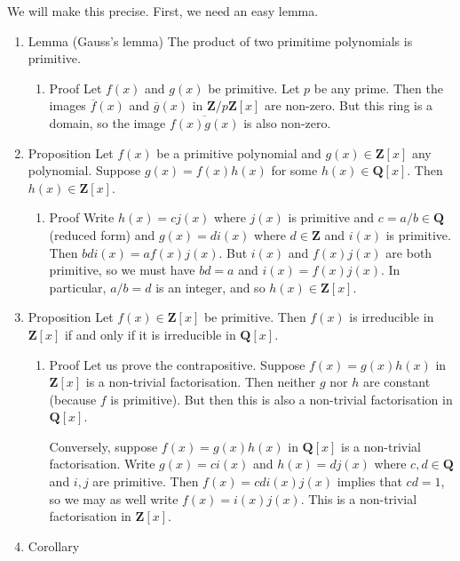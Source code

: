 \documentclass[11pt]{article}
\begin{document}
We will make this precise.
First, we need an easy lemma.
\begin{enumerate}
\item Lemma (Gauss's lemma)
\label{sec:orgea13c4b}
The product of two primitime polynomials is primitive.
\begin{enumerate}
\item Proof
\label{sec:org8aa2631}
Let \(f(x)\) and \(g(x)\) be primitive.
Let \(p\) be any prime.
Then the images \(\overline f(x)\) and \(\overline g(x)\) in \(\mathbf{Z}/p \mathbf{Z} [x]\) are non-zero.
But this ring is a domain, so the image \(\overline {f(x)g(x)}\) is also non-zero.
\end{enumerate}
\item Proposition
\label{sec:org0e98d48}
Let \(f(x)\) be a primitive polynomial and \(g(x) \in \mathbf{Z}[x]\) any polynomial.
Suppose \(g(x) = f(x) h(x)\) for some \(h(x) \in \mathbf{Q}[x]\).
Then \(h(x) \in \mathbf{Z}[x]\).
\begin{enumerate}
\item Proof
\label{sec:org1b851cd}
Write \(h(x) = c j(x)\) where \(j(x)\) is primitive and \(c = a/b \in \mathbf{Q}\) (reduced form) and \(g(x) = d i(x)\) where \(d \in \mathbf{Z}\) and \(i(x)\) is primitive.
Then \(bd i(x) = a f(x) j(x)\).
But \(i(x)\) and \(f(x)j(x)\) are both primitive, so we must have \(bd = a\) and \(i(x) = f(x)j(x)\).
In particular, \(a/b = d\) is an integer, and so \(h(x) \in \mathbf{Z}[x]\).
\end{enumerate}
\item Proposition
\label{sec:orgf482e56}
Let \(f(x) \in \mathbf{Z}[x]\) be primitive.
Then \(f(x)\) is irreducible in \(\mathbf{Z}[x]\) if and only if it is irreducible in \(\mathbf{Q}[x]\).
\begin{enumerate}
\item Proof
\label{sec:org66e5662}
Let us prove the contrapositive.
Suppose \(f(x) = g(x) h(x)\) in \(\mathbf{Z}[x]\) is a non-trivial factorisation.
Then neither \(g\) nor \(h\) are constant (because \(f\) is primitive).
But then this is also a non-trivial factorisation in \(\mathbf{Q}[x]\).

Conversely, suppose \(f(x) = g(x) h(x)\) in \(\mathbf{Q}[x]\) is a non-trivial factorisation.
Write \(g(x) = c i(x)\) and \(h(x) = d j(x)\) where \(c,d \in \mathbf{Q}\) and \(i,j\) are primitive.
Then \(f(x) = cd i(x)j(x)\) implies that \(cd = 1\), so we may as well write
\(f(x) = i(x) j(x)\).
This is a non-trivial factorisation in \(\mathbf{Z}[x]\).
\end{enumerate}
\item Corollary
\label{sec:org45a474e}


\end{enumerate}
\end{document}
